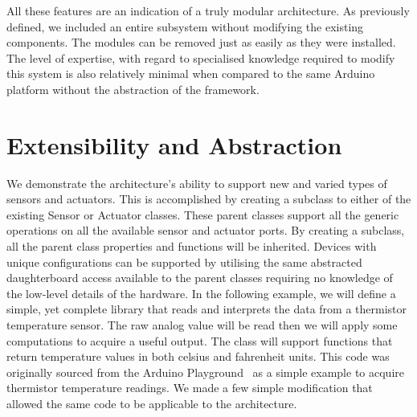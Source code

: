 All these features are an indication of a truly modular architecture. As previously defined, we included an entire subsystem without modifying the existing components. The modules can be removed just as easily as they were installed. The level of expertise, with regard to specialised knowledge required to modify this system is also relatively minimal when compared to  the same Arduino platform without the abstraction of the \xten framework.

\newpage
\section{Extensibility and Abstraction} %
\label{sec:extensibility_abstraction}
We demonstrate the \xten architecture's ability to support new and varied types of sensors and actuators. This is accomplished by creating a subclass to either of the existing Sensor or Actuator classes. These parent classes support all the generic operations on all the available sensor and actuator ports. By creating a subclass, all the parent class properties and functions will be inherited. Devices with unique configurations can be supported by utilising the same abstracted daughterboard access available to the parent classes requiring no knowledge of the low-level details of the hardware.
In the following example, we will define a simple, yet complete library that reads and interprets the data from a thermistor temperature sensor. The raw analog value will be read then we will apply some computations to acquire a useful output. The class will support functions that return temperature values in both celsius and fahrenheit units. This code was originally sourced from the Arduino Playground~\parencite{therm} as a simple example to acquire thermistor temperature readings. We made a few simple modification that allowed the same code to be applicable to the \xten architecture.

